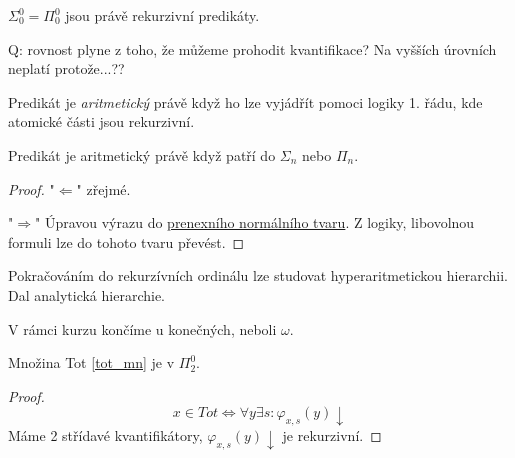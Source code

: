 \begin{observation}
	$\Sigma_0^0 = \Pi_0^0$ jsou právě rekurzivní predikáty.

Q: rovnost plyne z toho, že můžeme prohodit kvantifikace?
Na vyšších úrovních neplatí protože...??
\end{observation}

\begin{definition}
	Predikát je \emph{aritmetický} právě když ho lze vyjádřít pomoci logiky 1. řádu, kde atomické části jsou rekurzivní.
\end{definition}

\begin{observation}
	Predikát je aritmetický právě když patří do $\Sigma_n$ nebo $\Pi_n$.
\end{observation}
\begin{proof}
	"$\Leftarrow$" zřejmé.

	"$\Rightarrow$" Úpravou výrazu do \href{https://en.wikipedia.org/wiki/Prenex_normal_form}{prenexního normálního tvaru}.
	Z logiky, libovolnou formuli lze do tohoto tvaru převést.
\end{proof}

\begin{note}
	Pokračováním do rekurzívních ordinálu lze studovat hyperaritmetickou hierarchii. Dal analytická hierarchie.

	V rámci kurzu končíme u konečných, neboli $\omega$.
\end{note}

\begin{example}\label{tot_pi2}
	Množina Tot \cref{tot_mn} je v $\Pi_2^0$.
\end{example}
\begin{proof}
	\[ x \in Tot \iff \forall y \exists s: \varphi_{x, s}(y) \downarrow \]
	Máme 2 střídavé kvantifikátory, $\varphi_{x, s}(y) \downarrow$ je rekurzivní.
\end{proof}

